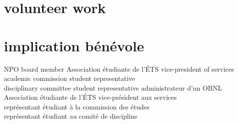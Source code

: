 \documentclass[print]{friggeri-cv}
\begin{document}
\ifdefined\isenglish\section{volunteer work}\else\section{implication bénévole}\fi
\begin{entrylist}
  \ifdefined\isenglish
     {{\small NPO} board member} {Association étudiante de l'{\scriptsize ÉTS}} {vice-president of services\\ academic commission student representative \\ disciplinary committee student representative}
  \else
     {administrateur d'un {\small OBNL}} {Association étudiante de l'{\scriptsize ÉTS}} {vice-président aux services\\représentant étudiant à la commission des études\\représentant étudiant au comité de discipline}
  \fi
\end{entrylist}
\newpage
\end{document}
